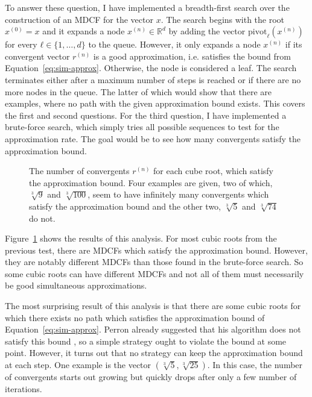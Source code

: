 To answer these question,
I have implemented a breadth-first search over the construction of an MDCF for the vector $x$.
The search begins with the root $x^{(0)} = x$ and it expands a node $x^{(n)} ∈ ℝ^d$
by adding the vector $\mathrm{pivot}_ℓ(x^{(n)})$ for every $ℓ ∈ \{1, …, d\}$ to the queue.
However, it only expands a node $x^{(n)}$
if its convergent vector $r^{(n)}$ is a good approximation,
i.e. satisfies the bound from Equation~\ref{eq:sim-approx}.
Otherwise, the node is considered a leaf.
The search terminates either after a maximum number of steps is reached or if
there are no more nodes in the queue.
The latter of which would show that there are examples, where no path with the
given approximation bound exists.
This covers the first and second questions.
For the third question, I have implemented a brute-force search,
which simply tries all possible sequences to test for the approximation rate.
The goal would be to see how many convergents satisfy the approximation bound.

\begin{figure}[tbp]
  \centering
  
  \caption{
    The number of convergents $r^{(n)}$ for each cube root, which
    satisfy the approximation bound.
    Four examples are given,
    two of which, $\sqrt[3]{9}$ and $\sqrt[3]{100}$, seem to have infinitely
    many convergents which satisfy the approximation bound and the other two,
    $\sqrt[3]{5}$ and $\sqrt[3]{74}$ do not.
  }
  \label{fig:results-approx}
\end{figure}

Figure~\ref{fig:results-approx} shows the results of this analysis.
For most cubic roots from the previous test,
there are MDCFs which satisfy the approximation bound.
However, they are notably different MDCFs than those found in the brute-force
search.
So some cubic roots can have different MDCFs
and not all of them must necessarily be good simultaneous approximations.

The most surprising result of this analysis is that there are some cubic roots
for which there exists no path which satisfies the approximation bound of Equation~\ref{eq:sim-approx}.
Perron already suggested that his algorithm does not satisfy this bound \cite{Perron07},
so a simple strategy ought to violate the bound at some point.
However, it turns out that no strategy can keep the approximation bound at each step.
One example is the vector $(\sqrt[3]{5}, \sqrt[3]{25})$.
In this case, the number of convergents starts out growing but quickly drops
after only a few number of iterations.

